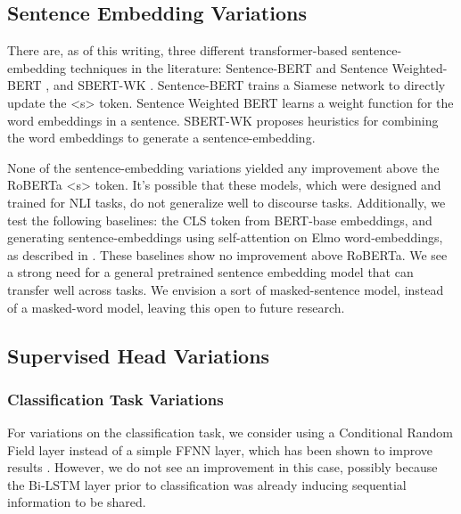\documentclass[11pt]{article}
\begin{document}
\subsection{Sentence Embedding Variations}
\label{app:sent_emb}

There are, as of this writing, three different transformer-based sentence-embedding techniques in the literature: Sentence-BERT and Sentence Weighted-BERT \cite{reimers2019sentence}, and SBERT-WK \cite{wang2020sbert}. Sentence-BERT trains a Siamese network to directly update the <s> token. Sentence Weighted BERT learns a weight function for the word embeddings in a sentence. SBERT-WK proposes heuristics for combining the word embeddings to generate a sentence-embedding.

None of the sentence-embedding variations yielded any improvement above the RoBERTa <s> token. It's possible that these models, which were designed and trained for NLI tasks, do not generalize well to discourse tasks. Additionally, we test the following baselines: the CLS token from BERT-base embeddings, and generating sentence-embeddings using self-attention on Elmo word-embeddings, as described in \cite{choubey-etal-2020-discourse}. These baselines show no improvement above RoBERTa. We see a strong need for a general pretrained sentence embedding model that can transfer well across tasks. We envision a sort of masked-sentence model, instead of a masked-word model, leaving this open to future research.

\subsection{Supervised Head Variations}
\label{app:supervised_head_variations}
\subsubsection{Classification Task Variations}
\label{app:classification_variations}

For variations on the classification task, we consider using a Conditional Random Field layer instead of a simple FFNN layer, which has been shown to improve results \cite{li2019discourse}. However, we do not see an improvement in this case, possibly because the Bi-LSTM layer prior to classification was already inducing sequential information to be shared.
\end{document}
